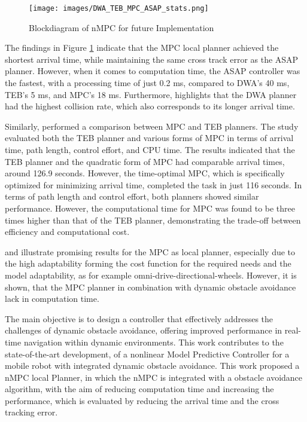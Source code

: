 \documentclass[conference]{IEEEtran}
\begin{document}
\begin{figure}[!h]
    \centering
    \texttt{[image: images/DWA\_TEB\_MPC\_ASAP\_stats.png]}
    \caption{Blockdiagram of nMPC for future Implementation }
    \label{fig:DWA_TEB_MPC_ASAP_stats}
\end{figure}

The findings in Figure \ref{fig:DWA_TEB_MPC_ASAP_stats} indicate that the MPC local planner achieved the shortest arrival time, while maintaining the same cross track error as the ASAP planner. However, when it comes to computation time, the ASAP controller was the fastest, with a processing time of just 0.2 ms, compared to DWA's 40 ms, TEB's 5 ms, and MPC's 18 ms. Furthermore, \cite{ASAP} highlights that the DWA planner had the highest collision rate, which also corresponds to its longer arrival time.

Similarly, \cite{MPCvsTEB} performed a comparison between MPC and TEB planners. The study evaluated both the TEB planner and various forms of MPC in terms of arrival time, path length, control effort, and CPU time. The results indicated that the TEB planner and the quadratic form of MPC had comparable arrival times, around 126.9 seconds. However, the time-optimal MPC, which is specifically optimized for minimizing arrival time, completed the task in just 116 seconds. In terms of path length and control effort, both planners showed similar performance. However, the computational time for MPC was found to be three times higher than that of the TEB planner, demonstrating the trade-off between efficiency and computational cost.

\cite{ASAP} and \cite{MPCvsTEB} illustrate promising results for the MPC as local planner, especially due to the high adaptability forming the cost function for the required needs and the model adaptability, as for example omni-drive-directional-wheels. However, it is shown, that the MPC planner in combination with dynamic obstacle avoidance lack in computation time.

The main objective is to design a controller that effectively addresses the challenges of dynamic obstacle avoidance, offering improved performance in real-time navigation within dynamic environments. This work contributes to the state-of-the-art development, of a nonlinear Model Predictive Controller for a mobile robot with integrated dynamic obstacle avoidance. This work proposed a nMPC local Planner, in which the nMPC is integrated with a obstacle avoidance algorithm, with the aim of reducing computation time and increasing the performance, which is evaluated by reducing the arrival time and the cross tracking error.
\end{document}

